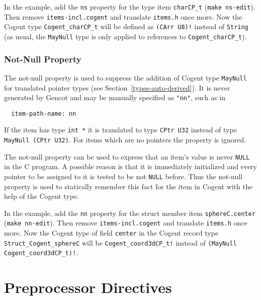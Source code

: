 \documentclass[a4paper]{report}
\newcommand{\code}[1]{\textnormal{\texttt{#1}}}
\begin{document}
In the example, add the \code{ns} property for the type item \code{charCP\_t} (\code{make ns-edit}). Then 
remove \code{items-incl.cogent} and translate \code{items.h} once more. Now the Cogent type \code{Cogent\_charCP\_t} will
be defined as \code{(CArr U8)!} instead of \code{String} (as usual, the \code{MayNull} type is only applied to
references to \code{Cogent\_charCP\_t}).

\subsection{Not-Null Property}
\label{types-manprops-nn}

The not-null property is used to suppress the addition of Cogent type \code{MayNull} for translated pointer types (see 
Section~\ref{types-auto-derived}). It is never generated by Gencot and may be manually specified as \code{"nn"}, such as in 
\begin{verbatim}
  item-path-name: nn
\end{verbatim}
If the item has type \code{int *} it is translated to type \code{CPtr U32} instead of type \code{MayNull (CPtr U32)}.
For items which are no pointers the property is ignored.

The not-null property can be used to express that an item's value is never \code{NULL} in the C program. A possible reason
is that it is immediately initialized and every pointer to be assigned to it is tested to be not \code{NULL} before. 
Thus the not-null property is used to statically remember this fact for the item in Cogent with the help of the Cogent
type.

In the example, add the \code{nn} property for the struct member item \code{sphereC.center} (\code{make nn-edit}). Then 
remove \code{items-incl.cogent} and translate \code{items.h} once more. Now the Cogent type of field \code{center} in
the Cogent record type \code{Struct\_Cogent\_sphereC} will be \code{Cogent\_coord3dCP\_t!} instead of 
\code{(MayNull Cogent\_coord3dCP\_t)!}.

\chapter{Preprocessor Directives}
\label{directives}
\end{document}
